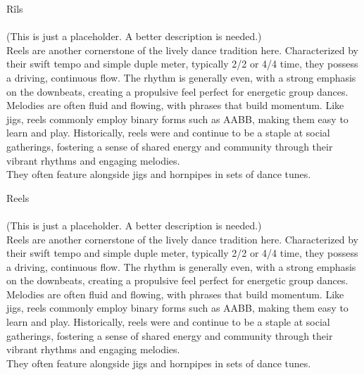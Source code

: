 \begin{multicols}{2}
    \Huge{Rîls}\\
    \vspace{1cm}\\
    \normalsize{
      \noindent 
      (This is just a placeholder. A better description is needed.)\\

      Reels are another cornerstone of the lively dance tradition here. 
      Characterized by their swift tempo and simple duple meter,
      typically 2/2 or 4/4 time, they possess a driving, continuous flow. 
      The rhythm is generally even, with a strong emphasis on the downbeats, 
      creating a propulsive feel perfect for energetic group dances.\\ 
      
      Melodies are often fluid and flowing, with phrases that build momentum. 
      Like jigs, reels commonly employ binary forms such as AABB, 
      making them easy to learn and play. Historically, reels were and continue 
      to be a staple at social gatherings, fostering a sense of shared energy 
      and community through their vibrant rhythms and engaging melodies.\\ 
      
      They often feature alongside jigs and hornpipes in sets of dance tunes.
    }

    \newcolumn

    \Huge{Reels}\\
    \vspace{1cm}\\
    \normalsize{
      \noindent
      (This is just a placeholder. A better description is needed.)\\

      Reels are another cornerstone of the lively dance tradition here. 
      Characterized by their swift tempo and simple duple meter,
      typically 2/2 or 4/4 time, they possess a driving, continuous flow. 
      The rhythm is generally even, with a strong emphasis on the downbeats, 
      creating a propulsive feel perfect for energetic group dances.\\ 
      
      Melodies are often fluid and flowing, with phrases that build momentum. 
      Like jigs, reels commonly employ binary forms such as AABB, 
      making them easy to learn and play. Historically, reels were and continue 
      to be a staple at social gatherings, fostering a sense of shared energy 
      and community through their vibrant rhythms and engaging melodies.\\ 
      
      They often feature alongside jigs and hornpipes in sets of dance tunes.
    }

    \end{multicols}